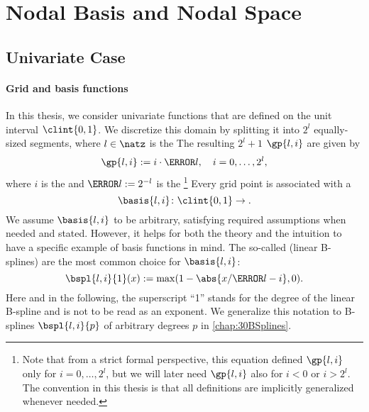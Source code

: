 \section{Nodal Basis and Nodal Space}
\label{sec:21nodalSpaces}


\mbox{}\vspace{-14mm}



\printornamentsfalse
\subsection{Univariate Case}
\label{sec:211nodalUV}
\printornamentstrue

\paragraph{Grid and basis functions}

In this thesis, we consider univariate functions
that are defined on the unit interval $\clint{0, 1}$.
We discretize this domain by splitting it into $2^l$ equally-sized segments,
where $l \in \natz$ is the 
The resulting $2^l + 1$  $\gp{l,i}$ are given by
\begin{equation}
  \gp{l,i} := i \cdot \ms{l},\quad
  i = 0, \dotsc, 2^l,
\end{equation}
where $i$ is the  and $\ms{l} := 2^{-l}$ is the %
\footnote{%
  Note that from a strict formal perspective,
  this equation defined $\gp{l,i}$ only for $i = 0, \dotsc, 2^l$,
  but we will later need $\gp{l,i}$ also for $i < 0$ or $i > 2^l$.
  The convention in this thesis is that all definitions are
  implicitly generalized whenever needed.%
}
Every grid point is associated with a 
\begin{equation}
  \basis{l,i}\colon \clint{0, 1} \to \real.
\end{equation}
We assume $\basis{l,i}$ to be arbitrary,
satisfying required assumptions when needed and stated.
However, it helps for both the theory and the intuition to have a
specific example of basis functions in mind.
The so-called  (linear B-splines)
are the most common choice for $\basis{l,i}$:
\begin{equation}
  \label{eq:hatFunctionUV}
  \bspl{l,i}{1}(x)
  := \max(1 - \abs{x/\ms{l} - i}, 0).
\end{equation}
Here and in the following,
the superscript ``1'' stands for the degree of the linear B-spline and
is not to be read as an exponent.
We generalize this notation to B-splines $\bspl{l,i}{p}$ of
arbitrary degrees $p$ in \cref{chap:30BSplines}.

